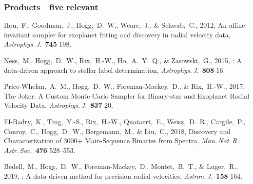 \documentclass[12pt, fullpage, letterpaper]{article}
\newcommand{\doi}[2]{#2}
\begin{document}
\subsubsection*{Products---five relevant} %
\begin{list}{}{\hogglist}
\item
Hou,~F., Goodman,~J., Hogg,~D.~W., Weare,~J., \& Schwab,~C., 2012,
\doi{10.1088/0004-637X/745/2/198}{An affine-invariant sampler for exoplanet fitting and discovery in radial velocity data},
\textit{Astrophys.\,J.}\ \textbf{745} 198.
\item
Ness,~M., Hogg,~D.~W., Rix,~H.-W., Ho,~A.~Y.~Q., \& Zasowski,~G., 2015,
\doi{10.1088/0004-637X/808/1/16}{: A data-driven
approach to stellar label determination},
\textit{Astrophys.\,J.}\ \textbf{808} 16.
\item
Price-Whelan,~A.~M., Hogg,~D.~W., Foreman-Mackey,~D., \& Rix,~H.-W., 2017,
\doi{10.3847/1538-4357/aa5e50}{The Joker: A Custom Monte Carlo Sampler for Binary-star and Exoplanet Radial Velocity Data},
\textit{Astrophys.\,J.}\ \textbf{837} 20.
\item
El-Badry,~K., Ting,~Y.-S., Rix,~H.-W., Quataert,~E., Weisz,~D.~R., Cargile,~P., Conroy,~C., Hogg,~D.~W., Bergemann,~M., \& Liu,~C., 2018,
\doi{10.1093/mnras/sty240}{Discovery and Characterization of 3000+ Main-Sequence Binaries from \project{APOGEE} Spectra},
\textit{Mon.\,Not.\,R.\,Astr.\,Soc.}\ \textbf{476} 528--553.
\item
Bedell,~M., Hogg,~D.~W., Foreman-Mackey,~D., Montet,~B.~T., \& Luger,~R., 2019,
\doi{10.3847/1538-3881/ab40a7}{: A data-driven method for precision radial velocities},
\textit{Astron.\,J.}\ \textbf{158} 164.
\end{list}
\end{document}
